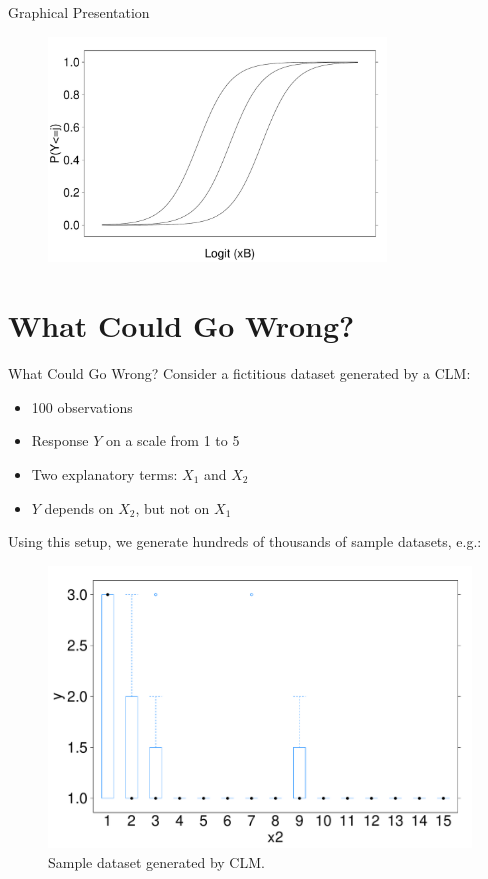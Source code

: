 \documentclass{beamer}
\begin{document}
\begin{frame}{Graphical Presentation}
\begin{figure}
\centering
\includegraphics[width=0.8\textwidth]{clm_plot}
\label{fig:clm_plot}
\end{figure}
\end{frame}

\section{What Could Go Wrong?}
\begin{frame}{What Could Go Wrong?}
Consider a fictitious dataset generated by a CLM:
\begin{itemize}
\item 100 observations
\item Response $Y$ on a scale from 1 to 5
\item Two explanatory terms: $X_1$ and $X_2$
\item $Y$ depends on $X_2$, but not on $X_1$
\end{itemize}
\end{frame}


\begin{frame}
Using this setup, we generate hundreds of thousands of sample datasets, e.g.:

\begin{figure}
\centering
\includegraphics[width=.9\textwidth]{sample_boxplot}
\caption{Sample dataset generated by CLM.}
\label{fig:sample_boxplot}
\end{figure}
\end{frame}
\end{document}
